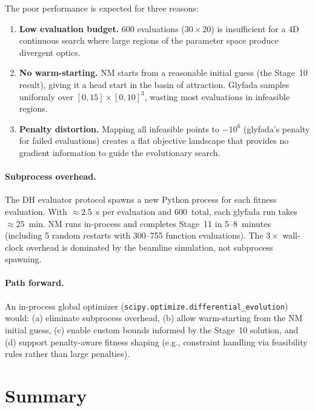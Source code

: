 \documentclass[11pt]{article}
\begin{document}
The poor performance is expected for three reasons:
\begin{enumerate}
  \item \textbf{Low evaluation budget.}  600 evaluations
    ($30 \times 20$) is insufficient for a 4D continuous
    search where large regions of the parameter space produce
    divergent optics.
  \item \textbf{No warm-starting.}  NM starts from a reasonable
    initial guess (the Stage~10 result), giving it a head start
    in the basin of attraction.  Glyfada samples uniformly over
    $[0, 15] \times [0, 10]^3$, wasting most evaluations in
    infeasible regions.
  \item \textbf{Penalty distortion.}  Mapping all infeasible points
    to $-10^6$ (glyfada's penalty for failed evaluations) creates
    a flat objective landscape that provides no gradient information
    to guide the evolutionary search.
\end{enumerate}

\paragraph{Subprocess overhead.}
The DH evaluator protocol spawns a new Python process for each
fitness evaluation.  With $\approx$\SI{2.5}{s} per evaluation and
600~total, each glyfada run takes $\approx$\SI{25}{min}.  NM runs
in-process and completes Stage~11 in 5--8~minutes (including 5
random restarts with 300--755 function evaluations).  The $3\times$
wall-clock overhead is dominated by the beamline simulation, not
subprocess spawning.

\paragraph{Path forward.}
An in-process global optimizer
(\texttt{scipy.optimize.differential\_evolution}) would:
(a) eliminate subprocess overhead,
(b) allow warm-starting from the NM initial guess,
(c) enable custom bounds informed by the Stage~10 solution, and
(d) support penalty-aware fitness shaping (e.g., constraint handling
via feasibility rules rather than large penalties).


\section{Summary}
\end{document}
